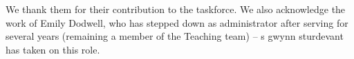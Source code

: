 We thank them for their contribution to the taskforce. We also acknowledge the work of Emily Dodwell, who has stepped down as administrator after serving for several years (remaining a member of the Teaching team) -- s gwynn sturdevant has taken on this role.


\address{%
Heather Turner\\
University of Warwick\\%
UK\\
%
%
%
\href{mailto:Heather.Turner@R-Project.org}{\nolinkurl{Heather.Turner@R-Project.org}}%
}
